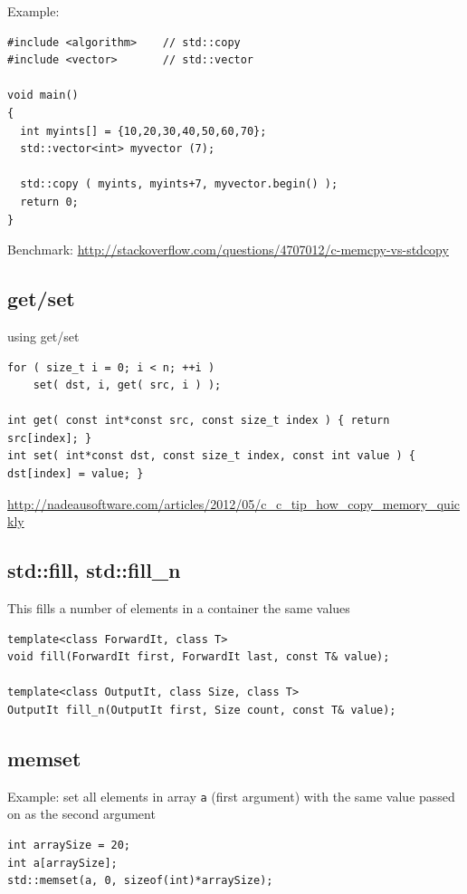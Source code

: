 Example:
\begin{lstlisting}
#include <algorithm>    // std::copy
#include <vector>       // std::vector

void main()
{
  int myints[] = {10,20,30,40,50,60,70};
  std::vector<int> myvector (7);

  std::copy ( myints, myints+7, myvector.begin() );
  return 0;
}
\end{lstlisting}

Benchmark: \url{http://stackoverflow.com/questions/4707012/c-memcpy-vs-stdcopy}

\subsection{get/set}

using get/set
\begin{lstlisting}
for ( size_t i = 0; i < n; ++i )
	set( dst, i, get( src, i ) );

int get( const int*const src, const size_t index ) { return src[index]; }
int set( int*const dst, const size_t index, const int value ) { dst[index] = value; }
\end{lstlisting}

\url{http://nadeausoftware.com/articles/2012/05/c_c_tip_how_copy_memory_quickly}

\subsection{std::fill, std::fill\_n}
\label{sec:std::fill}

This fills a number of elements in a container the same values
\begin{lstlisting}
template<class ForwardIt, class T>
void fill(ForwardIt first, ForwardIt last, const T& value);

template<class OutputIt, class Size, class T>
OutputIt fill_n(OutputIt first, Size count, const T& value);
\end{lstlisting}

\subsection{memset}
\label{sec:memset}

Example: set all elements in array \verb!a! (first argument) with the same value
passed on as the second argument
\begin{lstlisting}
int arraySize = 20;
int a[arraySize];
std::memset(a, 0, sizeof(int)*arraySize);
\end{lstlisting}

